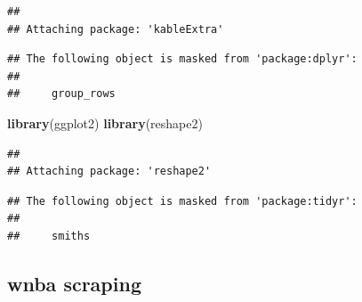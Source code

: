 \documentclass[]{article}
\newenvironment{Shaded}{\begin{snugshade}}{\end{snugshade}}
\newcommand{\DataTypeTok}[1]{\textcolor[rgb]{0.13,0.29,0.53}{#1}}
\newcommand{\DecValTok}[1]{\textcolor[rgb]{0.00,0.00,0.81}{#1}}
\newcommand{\KeywordTok}[1]{\textcolor[rgb]{0.13,0.29,0.53}{\textbf{#1}}}
\newcommand{\NormalTok}[1]{#1}
\newcommand{\OperatorTok}[1]{\textcolor[rgb]{0.81,0.36,0.00}{\textbf{#1}}}
\newcommand{\StringTok}[1]{\textcolor[rgb]{0.31,0.60,0.02}{#1}}
\begin{document}
\begin{verbatim}
## 
## Attaching package: 'kableExtra'
\end{verbatim}

\begin{verbatim}
## The following object is masked from 'package:dplyr':
## 
##     group_rows
\end{verbatim}

\begin{Shaded}
\begin{Highlighting}[]
\KeywordTok{library}\NormalTok{(ggplot2)}
\KeywordTok{library}\NormalTok{(reshape2)}
\end{Highlighting}
\end{Shaded}

\begin{verbatim}
## 
## Attaching package: 'reshape2'
\end{verbatim}

\begin{verbatim}
## The following object is masked from 'package:tidyr':
## 
##     smiths
\end{verbatim}

\hypertarget{wnba-scraping}{%
\subsection{wnba scraping}\label{wnba-scraping}}

\begin{Shaded}
\end{Shaded}
\end{document}
